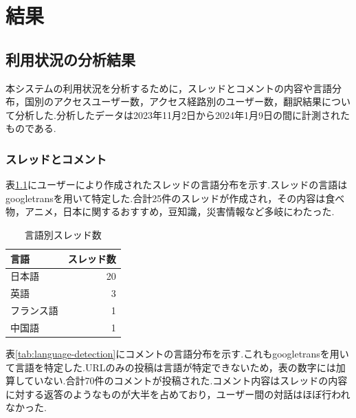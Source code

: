 \documentclass[b5paper,12pt,dvipdfmx]{jsreport}
\begin{document}
\chapter{結果}

\section{利用状況の分析結果}
本システムの利用状況を分析するために，スレッドとコメントの内容や言語分布，国別のアクセスユーザー数，アクセス経路別のユーザー数，翻訳結果について分析した.分析したデータは2023年11月2日から2024年1月9日の間に計測されたものである.

\subsection{スレッドとコメント}

表\ref{tab:thread-language}にユーザーにより作成されたスレッドの言語分布を示す.スレッドの言語はgoogletransを用いて特定した.合計25件のスレッドが作成され，その内容は食べ物，アニメ，日本に関するおすすめ，豆知識，災害情報など多岐にわたった.


\begin{table}[H]
    \centering
    \caption{言語別スレッド数}
    \label{tab:thread-language}
    \begin{tabular}{|l|r|}
        \hline
        \textbf{言語} & \textbf{スレッド数} \\ \hline
        日本語       & 20               \\
        英語         & 3                 \\
        フランス語    & 1                 \\
        中国語       & 1                 \\ \hline
    \end{tabular}
\end{table}

表\ref{tab:language-detection}にコメントの言語分布を示す.これもgoogletransを用いて言語を特定した.URLのみの投稿は言語が特定できないため，表の数字には加算していない.合計70件のコメントが投稿された.コメント内容はスレッドの内容に対する返答のようなものが大半を占めており，ユーザー間の対話はほぼ行われなかった.
\end{document}
